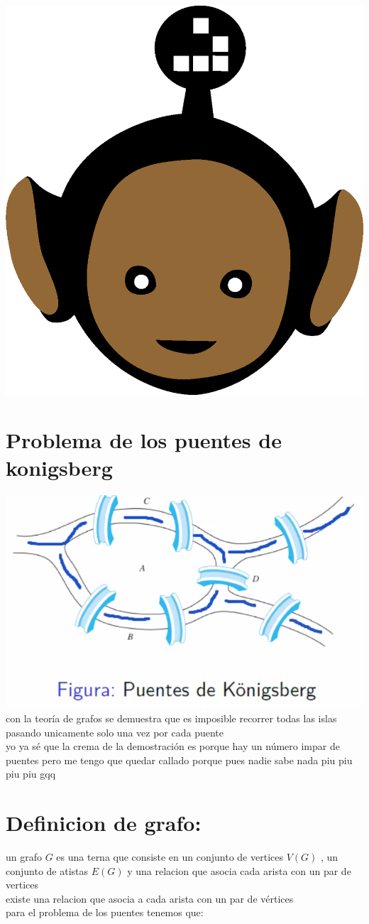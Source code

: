 \documentclass[10pt,a4paper]{article} %
\begin{document}
    \title{\rmfamily\normalfont{}}
    \author{}
    \date{\today} 
    
    \maketitle
     

    \includegraphics[width=0.1\linewidth]{negro_cara.png}
    \section{Problema de los puentes de konigsberg}
        \includegraphics[width=0.8\linewidth]{puentes.png} 
        \\con la teoría de grafos se demuestra que es imposible recorrer todas
        las islas pasando unicamente solo una vez por cada puente  
        \\ yo ya sé que la crema de la demostración es porque hay un número
        impar de puentes pero me tengo que quedar callado porque pues nadie
        sabe nada piu piu piu piu gqq 
    \section{Definicion de grafo:}
        un grafo $ G  $  es una terna que consiste en un conjunto
        de vertices $ V(G)  $  , un conjunto de atistas $ E(G)  $
        y una relacion que asocia cada arista con un par de
        vertices 
        \\ existe una relacion que asocia a cada arista con un par de vértices 
        \\ para el problema de los puentes tenemos que:
\end{document}
